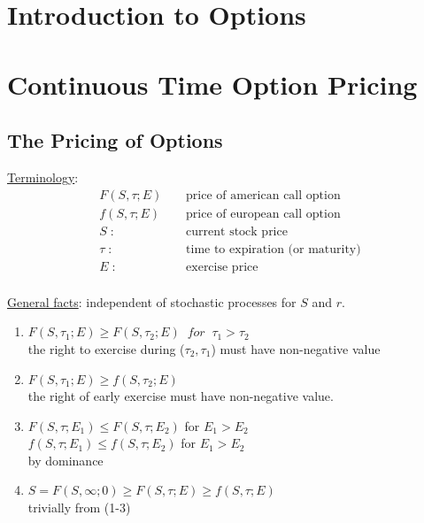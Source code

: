\documentclass[
14pt,notheorems,hyperref={pdfauthor=whatever}
]{beamer}
\begin{document}
\section{Introduction to Options}


\section{Continuous Time Option Pricing}

\subsection{The Pricing of Options}

\begin{frame}
\underline{Terminology}:
\begin{align*}
    F(S,\tau;E) &\;\;\;\; \text{price of american call option}\\
    f(S,\tau;E) &\;\;\;\; \text{price of european call option}\\
    S\;: &\;\;\;\; \text{current stock price}\\
    \tau\;: &\;\;\;\; \text{time to expiration (or maturity)}\\
    E\;: &\;\;\;\; \text{exercise price}\\
\end{align*}
\end{frame}

\begin{frame}
\underline{General facts}: independent of stochastic processes for $S$ and $r$.\\
\hfill
\begin{enumerate}
    \setcounter{enumi}{0}
    \item $F(S,\tau_1;E) \geq F(S,\tau_2;E) \;\;for\;\; \tau_1>\tau_2$\\
    the right to exercise during ($\tau_2,\tau_1$) must have non-negative value\\
    \hfill
    \item $F(S,\tau_1;E) \geq f(S,\tau_2;E)$\\
    the right of early exercise must have non-negative value.\\
    \hfill
    \item $F(S,\tau;E_1) \leq F(S,\tau;E_2)$ for $E_1 > E_2$\\
    $f(S,\tau;E_1) \leq f(S,\tau;E_2)$ for $E_1 > E_2$\\
    by dominance\\
    \hfill
    \item $S = F(S,\infty;0) \geq F(S,\tau;E) \geq f(S,\tau;E)$\\
    trivially from (1-3)\\
\end{enumerate}
\end{frame}
\end{document}
